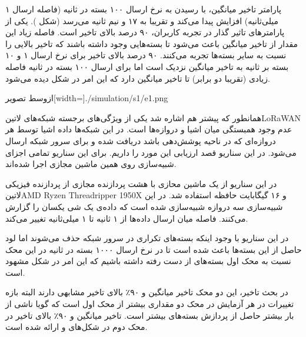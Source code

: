 پارامتر تاخیر میانگین، با رسیدن به نرخ ارسال ۱۰۰ بسته در ثانیه (فاصله ارسال ۱ میلی‌ثانیه) افزایش پیدا می‌کند و
تقریبا به ۱۷ و نیم ثانیه می‌رسد (شکل ).
یکی از پارامترهای تاثیر گذار در تجربه کاربران، ۹۰ درصد بالای تاخیر است.
فاصله زیاد این مقدار از تاخیر میانگین باعث می‌شود تا بسته‌هایی وجود داشته باشند که تاخیر بالایی را نسبت به سایر بسته‌ها تجربه می‌کنند.
۹۰ درصد بالای تاخیر برای نرخ ارسال ۱ و ۱۰ بسته بر ثانیه به تاخیر میانگین نزدیک است اما برای ارسال ۱۰۰ بسته در ثانیه فاصله زیادی (تقریبا دو برابر) تا تاخیر میانگین دارد که این امر
در شکل  دیده می‌شود.

‌ازوسط
‌تصویر[width=\textwidth]{./simulation/s1/e1.png}


همانطور که پیشتر هم اشاره شد یکی از ویژگی‌های برجسته شبکه‌های ‌لاتین{LoRaWAN} عدم وجود
همبستگی میان اشیا و دروازه‌ها است. در این شبکه‌ها داده اشیا توسط هر دروازه‌ای
که در ناحیه پوشش‌دهی باشد دریافت شده و برای سرور شبکه ارسال می‌شود.
در این سناریو قصد ارزیابی این مورد را داریم.
برای این سناریو تمامی اجزای شبیه‌سازی روی همین ماشین مجازی اجرا شده‌اند.

در این سناریو از یک ماشین محازی با هشت پردازنده مجازی از پردازنده فیزیکی
‌لاتین{AMD Ryzen Threadripper 1950X}
و ۱۶ گیگابایت حافظه استفاده شد.
در این شبیه‌سازی سه دروازه شبیه‌سازی شده است که داده‌ی یک شی یکسان را گزارش می‌کنند. فاصله میان ارسال داده‌ها از ۱ ثانیه تا ۱ میلی‌ثانیه تغییر می‌کند.

در این سناریو با وجود اینکه بسته‌های تکراری در سرور شبکه حذف می‌شوند اما لود حاصل از این بسته‌ها باعث شده است تا در نرخ ارسال ۱۰۰۰ بسته در ثانیه
در این محک نسبت به محک اول بسته‌های از دست رفته داشته باشیم که این امر در شکل 
مشهود است.

در بحث تاخیر، این دو محک تاخیر میانگین و ۹۰٪ بالای تاخیر مشابهی دارند البته بازه تغییرات در هر آزمایش در محک دو مقداری بیشتر از محک اول است
که گویا ناشی از بار بیشتر حاصل از پردازش بسته‌های بیشتر است.
تاخیر میانگین و ۹۰٪ بالای تاخیر در محک دوم در شکل‌های 
و 
ارائه شده است.

